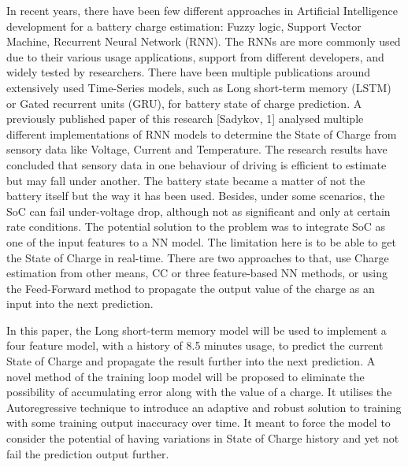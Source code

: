 %
%
In recent years, there have been few different approaches in Artificial Intelligence development for a battery charge estimation: Fuzzy logic, Support Vector Machine, Recurrent Neural Network (RNN).
The RNNs are more commonly used due to their various usage applications, support from different developers, and widely tested by researchers.
There have been multiple publications around extensively used Time-Series models, such as Long short-term memory (LSTM) or Gated recurrent units (GRU), for battery state of charge prediction.
A previously published paper of this research [Sadykov, 1] analysed multiple different implementations of RNN models to determine the State of Charge from sensory data like Voltage, Current and Temperature.
The research results have concluded that sensory data in one behaviour of driving is efficient to estimate but may fall under another.
The battery state became a matter of not the battery itself but the way it has been used.
Besides, under some scenarios, the SoC can fail under-voltage drop, although not as significant and only at certain rate conditions.
The potential solution to the problem was to integrate SoC as one of the input features to a NN model.
The limitation here is to be able to get the State of Charge in real-time.
There are two approaches to that, use Charge estimation from other means, CC or three feature-based NN methods, or using the Feed-Forward method to propagate the output value of the charge as an input into the next prediction.

%
%
In this paper, the Long short-term memory model will be used to implement a four feature model, with a history of 8.5 minutes usage, to predict the current State of Charge and propagate the result further into the next prediction.
A novel method of the training loop model will be proposed to eliminate the possibility of accumulating error along with the value of a charge.
It utilises the Autoregressive technique to introduce an adaptive and robust solution to training with some training output inaccuracy over time.
It meant to force the model to consider the potential of having variations in State of Charge history and yet not fail the prediction output further.

